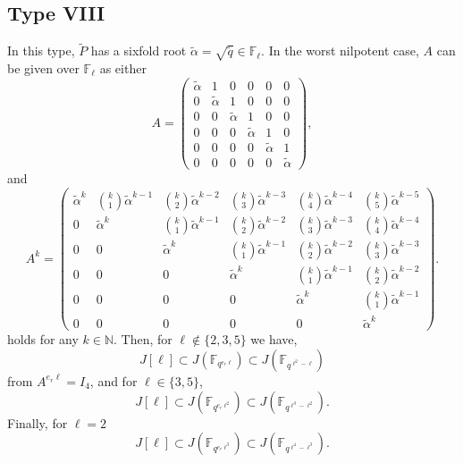 \documentclass[11pt,a4paper]{article}
\theoremstyle{plain}
\theoremstyle{definition}
\theoremstyle{remark}
\begin{document}
\subsection*{Type VIII}
In this type, $\tilde{P}$ has a sixfold  root $\tilde{\alpha}=\sqrt{\tilde{q}}\in \mathbb{F}_\ell$. In the worst nilpotent case, $A$ can be given over $\mathbb{F}_\ell$ as either
\[
A =
\begin{pmatrix}
\tilde{\alpha} & 1 & 0 & 0 & 0 & 0\\
0 & \tilde{\alpha} & 1 & 0 & 0 & 0\\
0 & 0 & \tilde{\alpha} & 1 & 0 & 0\\
0 & 0 & 0 & \tilde{\alpha} & 1 & 0\\
0 & 0 & 0 & 0 & \tilde{\alpha} & 1\\
0 & 0 & 0 & 0 & 0 & \tilde{\alpha}
\end{pmatrix},
\]
and
\[
A^k =
\begin{pmatrix}
\tilde{\alpha}^{k} &
\binom{k}{1}\tilde{\alpha}^{k-1} &
\binom{k}{2}\tilde{\alpha}^{k-2} &
\binom{k}{3}\tilde{\alpha}^{k-3} &
\binom{k}{4}\tilde{\alpha}^{k-4} &
\binom{k}{5}\tilde{\alpha}^{k-5}
\\
0 &
\tilde{\alpha}^{k} &
\binom{k}{1}\tilde{\alpha}^{k-1} &
\binom{k}{2}\tilde{\alpha}^{k-2} &
\binom{k}{3}\tilde{\alpha}^{k-3} &
\binom{k}{4}\tilde{\alpha}^{k-4}
\\
0 & 0 &
\tilde{\alpha}^{k} &
\binom{k}{1}\tilde{\alpha}^{k-1} &
\binom{k}{2}\tilde{\alpha}^{k-2} &
\binom{k}{3}\tilde{\alpha}^{k-3}
\\[6pt]
0 & 0 & 0 &
\tilde{\alpha}^{k} &
\binom{k}{1}\tilde{\alpha}^{k-1} &
\binom{k}{2}\tilde{\alpha}^{k-2}
\\[6pt]
0 & 0 & 0 & 0 &
\tilde{\alpha}^{k} &
\binom{k}{1}\tilde{\alpha}^{k-1}
\\[6pt]
0 & 0 & 0 & 0 & 0 &
\tilde{\alpha}^{k}
\end{pmatrix}.
\]
holds for any $k \in \mathbb{N}$. Then, for  $ \ell \not\in\{2, 3,5\}$ we have, 
\begin{equation*}
    J[\ell] \subset J (\mathbb{F}_{q^{e_r\ell}} ) \subset J (\mathbb{F}_{q^{\ell^2-\ell}})
\end{equation*}
from $A^{e_r\ell} = I_4$, and for $\ell \in \{ 3,5\}$, 
\begin{equation*}
    J[\ell] \subset J (\mathbb{F}_{q^{e_r\ell^2}} ) \subset J (\mathbb{F}_{q^{\ell^3-\ell^2}}).
\end{equation*}
Finally, for $\ell=2$
\begin{equation*}
    J[\ell] \subset J (\mathbb{F}_{q^{e_r\ell^3}} ) \subset J (\mathbb{F}_{q^{\ell^4-\ell^3}}).
\end{equation*}
\end{document}
